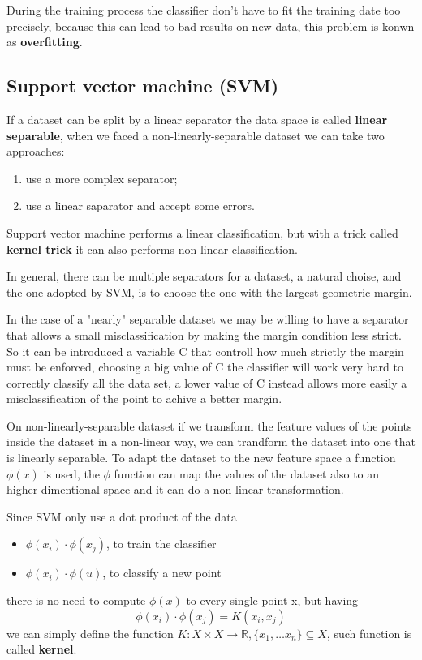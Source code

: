 \documentclass[12pt]{article}
\begin{document}
During the training process the classifier don't have to fit the training date 
too precisely, because this can lead to bad results on new data, this problem is konwn
as \textbf{overfitting}. 

\subsection{Support vector machine (SVM)}

If a dataset can be split by a linear separator the data space is called
\textbf{linear separable}, when we faced a non-linearly-separable dataset we can take
two approaches:
\begin{enumerate}
    \item use a more complex separator;
    \item use a linear saparator and accept some errors.
\end{enumerate}

Support vector machine performs a linear classification, but with a trick called 
\textbf{kernel trick} it can also performs non-linear classification.

In general, there can be multiple separators for a dataset, a natural choise, and
the one adopted by SVM, is to choose the one with the largest geometric margin.

In the case of a "nearly" separable dataset we may be willing to have a separator
that allows a small misclassification by making the margin condition less strict.
So it can be introduced a variable C that controll how much strictly the margin 
must be enforced, choosing a big value of C the classifier will work very hard
to correctly classify
all the data set, a lower value of C instead allows more easily a 
misclassification of the point to achive a better margin.

On non-linearly-separable dataset if we transform the feature values of the points
inside the dataset in a non-linear way, we can trandform the dataset into one that
is linearly separable. To adapt the dataset to the new feature space a function 
$\phi(x)$ is used, the $\phi$ function can map the values of the dataset also to 
an higher-dimentional space and it can do a non-linear transformation.

Since SVM only use a dot product of the data
\begin{itemize}
    \item $\phi(x_i) \cdot \phi(x_j)$, to train the classifier
    \item $\phi(x_i) \cdot \phi(u)$, to classify a new point
\end{itemize}
there is no need to compute $\phi(x)$ to every single point x, but having
$$
    \phi(x_i) \cdot \phi(x_j)  = K(x_i, x_j)
$$
we can simply define the function 
$K : X \times X \to\mathbb{R}, \{x_1,\dots x_n\} \subseteq X$, such function is 
called \textbf{kernel}.
\end{document}

